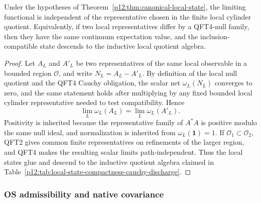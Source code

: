 \documentclass[12pt,a4paper]{article}
\begin{document}
\begin{corollary}
\label{p12:cor:canonical-local-state-quotient-discharge}
Under the hypotheses of Theorem~\ref{p12:thm:canonical-local-state}, the limiting functional is independent of the representative chosen in the finite local cylinder quotient.  Equivalently, if two local representatives differ by a QFT4-null family, then they have the same continuum expectation value, and the inclusion-compatible state descends to the inductive local quotient algebra.
\end{corollary}
\begin{proof}
Let \(A_L\) and \(A'_L\) be two representatives of the same local observable in a bounded region \(\mathcal O\), and write \(N_L=A_L-A'_L\).  By definition of the local null quotient and the QFT4 Cauchy obligation, the scalar net \(\omega_L(N_L)\) converges to zero, and the same statement holds after multiplying by any fixed bounded local cylinder representative needed to test compatibility.  Hence
\[
\lim_L\omega_L(A_L)=\lim_L\omega_L(A'_L).
\]
Positivity is inherited because the representative family of \(A^*A\) is positive modulo the same null ideal, and normalization is inherited from \(\omega_L(\mathbf 1)=1\).  If \(\mathcal O_1\subset\mathcal O_2\), QFT2 gives common finite representatives on refinements of the larger region, and QFT4 makes the resulting scalar limits path-independent.  Thus the local states glue and descend to the inductive quotient algebra claimed in Table~\ref{p12:tab:local-state-compactness-cauchy-discharge}.
\end{proof}


\subsubsection{OS admissibility and native covariance}
\label{p12:sec:os-admissibility-native-covariance}
\end{document}
